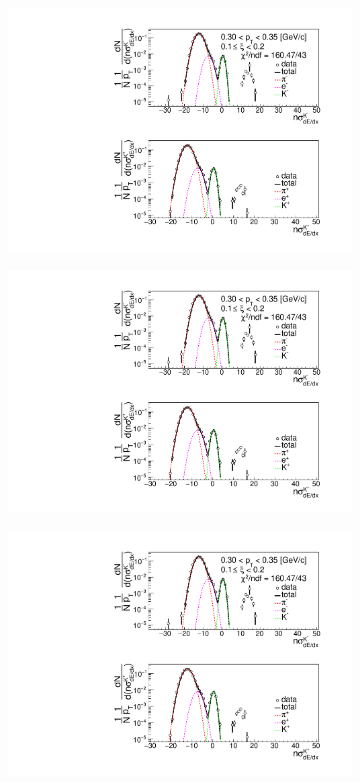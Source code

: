 \begin{figure}[h!]
	\centering
	\begin{subfigure}{.33\textwidth}
		\includegraphics[width=\linewidth, page=1]{chapters/chrgSTAR/img/dEdx/fit2019_thirdStep_1_2.pdf}
	\end{subfigure}
	\begin{subfigure}{.33\textwidth}
		\includegraphics[width=\linewidth, page=2]{chapters/chrgSTAR/img/dEdx/fit2019_thirdStep_1_2.pdf}
	\end{subfigure}
	\begin{subfigure}{.3\textwidth}
		\includegraphics[width=\linewidth, page=3]{chapters/chrgSTAR/img/dEdx/fit2019_thirdStep_1_2.pdf}

\end{subfigure}
\end{figure}

